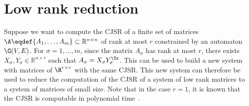 \section{Low rank reduction}
\label{sec:lowrank}
Suppose we want to compute the CJSR of a finite set of matrices $\A \eqdef \{A_1, \ldots, A_m\} \subset \mathbb{R}^{n \times n}$ of rank at most $r$ constrained by an automaton $\G(V,E)$.
For $\sigma = 1, \ldots, m$, since the matrix $A_\sigma$ has rank at most $r$, there exists $X_\sigma, Y_\sigma \in \mathbb{R}^{n \times r}$ such that $A_\sigma = X_\sigma Y_\sigma^\Tr$.
This can be used to build a new system with matrices of $\R^{r \times r}$ with the same CJSR.
This new system can therefore be used to reduce the computation of the CJSR of a system of low rank matrices to a system of matrices of small size.
Note that in the case $r=1$, it is known that the CJSR is computable in polynomial time~\cite{ahmadi2012joint}.


